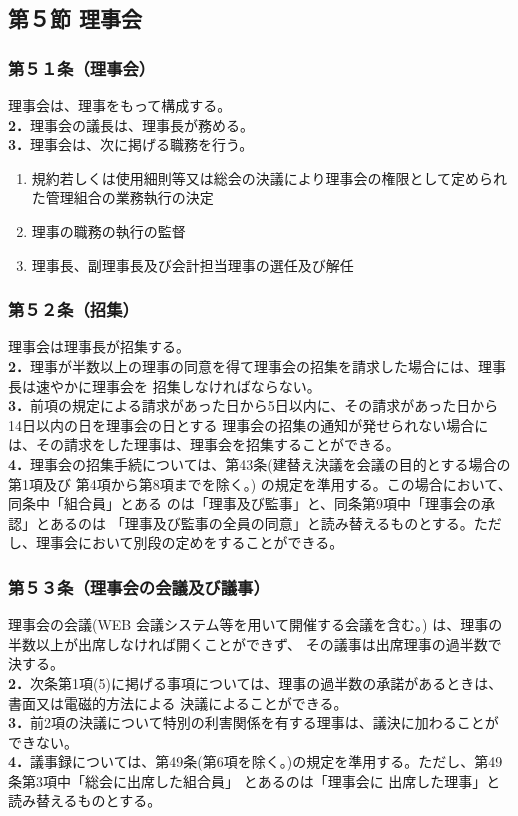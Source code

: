 \documentclass[12pt,uplatex,dvipdfmx]{jsarticle}
\begin{document}
\begin{center}
\subsection*{第５節 理事会}
\end{center}
\subsubsection*{第５１条（理事会）}
理事会は、理事をもって構成する。\\
\textbf{2．}理事会の議長は、理事長が務める。\\
\textbf{3．}理事会は、次に掲げる職務を行う。
\begin{enumerate}
  \item 規約若しくは使用細則等又は総会の決議により理事会の権限として定められた管理組合の業務執行の決定
  \item 理事の職務の執行の監督
  \item 理事長、副理事長及び会計担当理事の選任及び解任
\end{enumerate}
\subsubsection*{第５２条（招集）}
理事会は理事長が招集する。\\
\textbf{2．}理事が半数以上の理事の同意を得て理事会の招集を請求した場合には、理事長は速やかに理事会を
招集しなければならない。\\
\textbf{3．}前項の規定による請求があった日から5日以内に、その請求があった日から14日以内の日を理事会の日とする
理事会の招集の通知が発せられない場合には、その請求をした理事は、理事会を招集することができる。\\
\textbf{4．}理事会の招集手続については、第43条(建替え決議を会議の目的とする場合の第1項及び 第4項から第8項までを除く。)
の規定を準用する。この場合において、同条中「組合員」とある のは「理事及び監事」と、同条第9項中「理事会の承認」とあるのは
「理事及び監事の全員の同意」と読み替えるものとする。ただし、理事会において別段の定めをすることができる。
\subsubsection*{第５３条（理事会の会議及び議事）}
理事会の会議(WEB 会議システム等を用いて開催する会議を含む。) は、理事の半数以上が出席しなければ開くことができず、
その議事は出席理事の過半数で決する。\\
\textbf{2．}次条第1項(5)に掲げる事項については、理事の過半数の承諾があるときは、書面又は電磁的方法による
決議によることができる。\\
\textbf{3．}前2項の決議について特別の利害関係を有する理事は、議決に加わることができない。\\
\textbf{4．}議事録については、第49条(第6項を除く。)の規定を準用する。ただし、第49条第3項中「総会に出席した組合員」
とあるのは「理事会に 出席した理事」と読み替えるものとする。\\
\end{document}
